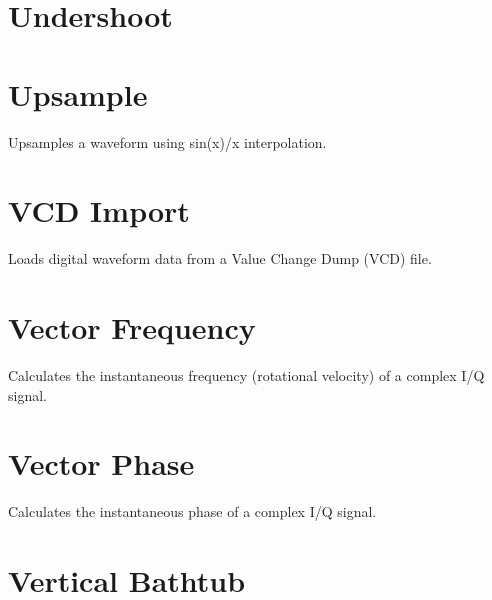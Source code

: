 \pagebreak
\section{Undershoot}

\pagebreak
\section{Upsample}

Upsamples a waveform using sin(x)/x interpolation.

\pagebreak
\section{VCD Import}

Loads digital waveform data from a Value Change Dump (VCD) file.

\pagebreak
\section{Vector Frequency}
\label{filter:vector_frequency}

Calculates the instantaneous frequency (rotational velocity) of a complex I/Q signal.

\pagebreak
\section{Vector Phase}

Calculates the instantaneous phase of a complex I/Q signal.

\pagebreak
\section{Vertical Bathtub}

\pagebreak
